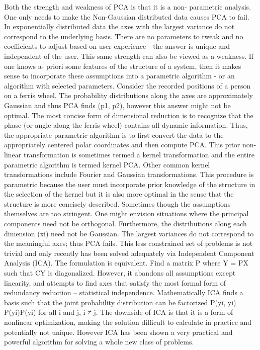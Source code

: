 \documentclass[10pt,a4paper]{article}
\begin{document}
    Both the strength and weakness of PCA is that it is a non-
parametric analysis. One only needs to make the Non-Gaussian
distributed data causes PCA to fail. In exponentially
distributed data the axes with the largest variance do not
correspond to the underlying basis. There are no parameters to
tweak and no coefficients to adjust based on user experience -
the answer is unique and independent of the user. This same
strength can also be viewed as a weakness. If one knows a-
priori some features of the structure of a system, then it makes
sense to incorporate these assumptions into a parametric
algorithm - or an algorithm with selected parameters. Consider
the recorded positions of a person on a ferris wheel. The
probability distributions along the axes are approximately
Gaussian and thus PCA finds (p1, p2), however this answer
might not be optimal. The most concise form of dimensional
reduction is to recognize that the phase (or angle along the
ferris wheel) contains all dynamic information. Thus, the
appropriate parametric algorithm is to first convert the data to
the appropriately centered polar coordinates and then compute
PCA. This prior non-linear transformation is sometimes
termed a kernel transformation and the entire parametric
algorithm is termed kernel PCA. Other common kernel
transformations include Fourier and Gaussian transformations.
This procedure is parametric because the user must
incorporate prior knowledge of the structure in the selection of
the kernel but it is also more optimal in the sense that the
structure is more concisely described. Sometimes though the
assumptions themselves are too stringent. One might envision
situations where the principal components need not be
orthogonal. Furthermore, the distributions along each
dimension (xi) need not be Gaussian. The largest variances do
not correspond to the meaningful axes; thus PCA fails. This
less constrained set of problems is not trivial and only recently
has been solved adequately via Independent Component
Analysis (ICA). The formulation is equivalent. Find a matrix P
where Y = PX such that CY is diagonalized. However, it
abandons all assumptions except linearity, and attempts to find
axes that satisfy the most formal form of redundancy reduction
– statistical independence. Mathematically ICA finds a basis
such that the joint probability distribution can be factorized
P(yi, yi) = P(yi)P(yi) for all i and j, i ≠ j. The downside of ICA
is that it is a form of nonlinear optimization, making the
solution difficult to calculate in practice and potentially not
unique. However ICA has been shown a very practical and
powerful algorithm for solving a whole new class of problems.
\end{document}
